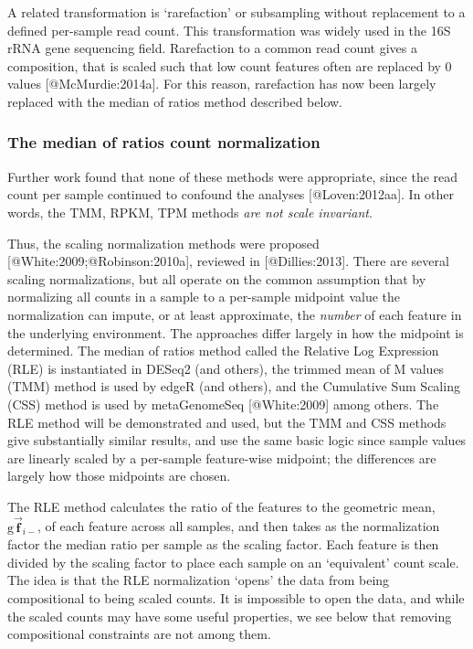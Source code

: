 \documentclass[
  onecolumn]{article}
\newcommand{\vect}[1]{\vec{\textbf{#1}}}
\begin{document}
A related transformation is `rarefaction' or subsampling without replacement to a defined per-sample read count. This transformation was widely used in the 16S rRNA gene sequencing field. Rarefaction to a common read count gives a composition, that is scaled such that low count features often are replaced by 0 values {[}@McMurdie:2014a{]}. For this reason, rarefaction has now been largely replaced with the median of ratios method described below.

\hypertarget{the-median-of-ratios-count-normalization}{%
\subsubsection{The median of ratios count normalization}\label{the-median-of-ratios-count-normalization}}

Further work found that none of these methods were appropriate, since the read count per sample continued to confound the analyses {[}@Loven:2012aa{]}. In other words, the TMM, RPKM, TPM methods \emph{are not scale invariant}.

Thus, the scaling normalization methods were proposed {[}@White:2009;@Robinson:2010a{]}, reviewed in {[}@Dillies:2013{]}. There are several scaling normalizations, but all operate on the common assumption that by normalizing all counts in a sample to a per-sample midpoint value the normalization can impute, or at least approximate, the \emph{number} of each feature in the underlying environment. The approaches differ largely in how the midpoint is determined. The median of ratios method called the Relative Log Expression (RLE) is instantiated in DESeq2 (and others), the trimmed mean of M values (TMM) method is used by edgeR (and others), and the Cumulative Sum Scaling (CSS) method is used by metaGenomeSeq {[}@White:2009{]} among others. The RLE method will be demonstrated and used, but the TMM and CSS methods give substantially similar results, and use the same basic logic since sample values are linearly scaled by a per-sample feature-wise midpoint; the differences are largely how those midpoints are chosen.

The RLE method calculates the ratio of the features to the geometric mean, \(\mathrm{g}\vect{f}_{i-}\), of each feature across all samples, and then takes as the normalization factor the median ratio per sample as the scaling factor. Each feature is then divided by the scaling factor to place each sample on an `equivalent' count scale. The idea is that the RLE normalization `opens' the data from being compositional to being scaled counts. It is impossible to open the data, and while the scaled counts may have some useful properties, we see below that removing compositional constraints are not among them.
\end{document}
